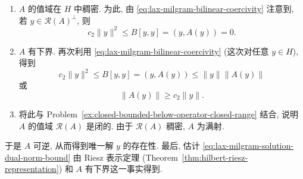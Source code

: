 \begin{Proof}
\begin{enumerate}
\begin{equation}
\|A(y)\|\leq c_1\|y\|.
\end{equation}
\item $A$ 的值域在 $H$ 中稠密. 为此, 由 \eqref{eq:lax-milgram-bilinear-coercivity} 注意到, 若 $y\in\mathcal{R}(A)^\perp$, 则
\begin{equation}\label{eq:lax-milgram-associated-operator-range-dense}
c_2\|y\|^2\leq B[y,y]=(y,A(y))=0.
\end{equation}
\item $A$ 有下界. 再次利用 \eqref{eq:lax-milgram-bilinear-coercivity} (这次对任意 $y\in H$), 得到
\begin{equation}\label{eq:lax-milgram-associated-operator-lower-calculation}
c_2\|y\|^2\leq B[y,y]=(y,A(y))\leq\|y\|\|A(y)\|
\end{equation}
或
\begin{equation}\label{eq:lax-milgram-associated-operator-bounded-below}
\|A(y)\|\geq c_2\|y\|.
\end{equation}
\item 将此与 Problem~\ref{ex:closed-bounded-below-operator-closed-range} 结合, 说明 $A$ 的值域 $\mathcal{R}(A)$ 是闭的. 由于 $\mathcal{R}(A)$ 稠密, $A$ 为满射.\end{enumerate}于是 $A$ 可逆, 从而得到唯一解 $y$ 的存在性. 最后, 估计 \eqref{eq:lax-milgram-solution-dual-norm-bound} 由 Riesz 表示定理 (Theorem~\ref{thm:hilbert-riesz-representation}) 和 $A$ 有下界这一事实得到.
\end{Proof}
